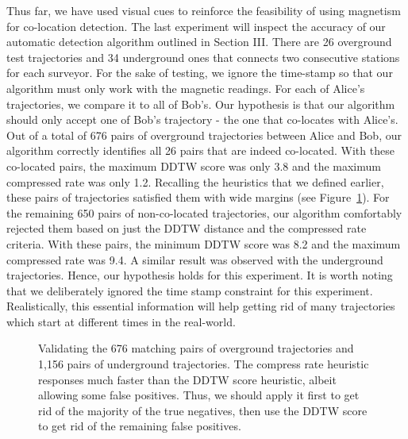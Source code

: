 \documentclass[conference]{IEEEtran}
\begin{document}
Thus far, we have used visual cues to reinforce the feasibility of using magnetism for co-location detection. The last experiment will inspect the accuracy of our automatic detection algorithm outlined in Section III. There are 26 overground test trajectories and 34 underground ones that connects two consecutive stations for each surveyor. For the sake of testing, we ignore the time-stamp so that our algorithm must only work with the magnetic readings. For each of Alice's trajectories, we compare it to all of Bob's. Our hypothesis is that our algorithm should only accept one of Bob's trajectory - the one that co-locates with Alice's.
Out of a total of 676 pairs of overground trajectories between Alice and Bob, our algorithm correctly identifies all 26 pairs that are indeed co-located. With these co-located pairs, the maximum DDTW score was only 3.8 and the maximum compressed rate was only 1.2. Recalling the heuristics that we defined earlier, these pairs of trajectories satisfied them with wide margins (see Figure~\ref{decisionthreshold}). For the remaining 650 pairs of non-co-located trajectories, our algorithm comfortably rejected them based on just the DDTW distance and the compressed rate criteria. With these pairs, the minimum DDTW score was 8.2 and the maximum compressed rate was 9.4. A similar result was observed with the underground trajectories. Hence, our hypothesis holds for this experiment. It is worth noting that we deliberately ignored the time stamp constraint for this experiment. Realistically, this essential information will help getting rid of many trajectories which start at different times in the real-world.
\begin{figure}[!t]
	\centering
	
	\hfil

	\caption{Validating the 676 matching pairs of overground trajectories and 1,156 pairs of underground trajectories. The compress rate heuristic responses much faster than the DDTW score heuristic, albeit allowing some false positives. Thus, we should apply it first to get rid of the majority of the true negatives, then use the DDTW score to get rid of the remaining false positives.}
	\label{decisionthreshold}
\end{figure}
\end{document}
